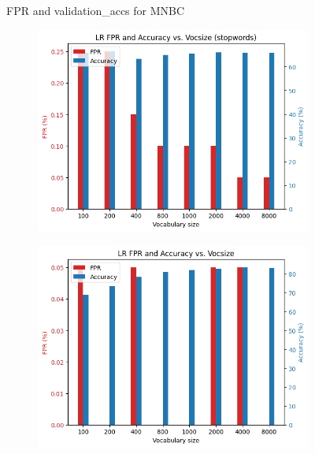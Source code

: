\documentclass{article}
\begin{document}
\begin{multicols}{2}
\begin{figure}[H]
        \caption{\footnotesize FPR and validation\_accs for MNBC}
        \label{fig:MNBC}
    \end{figure}

    \begin{figure}[H]
        \begin{subfigure}{\linewidth}
        \centering
        \includegraphics[width=0.97\columnwidth]{Figures/FPR_lr_stop.png}
        \end{subfigure}
        
        \begin{subfigure}{\linewidth}
        \centering
        \includegraphics[width=0.97\columnwidth]{Figures/FPR_lr_nostop.png}
        \end{subfigure}
        

\end{figure}
\end{multicols}
\end{document}
